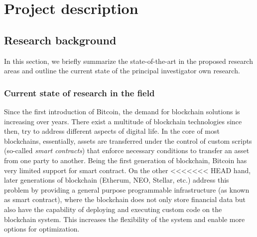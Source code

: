 \newpage
\setcounter{page}{1}
\section{Project description}

\subsection{Research background}

In this section, we briefly summarize the state-of-the-art in the proposed
research areas and outline the current state of the principal investigator own
research.

\subsubsection{Current state of research in the field}
Since the first introduction of Bitcoin, the demand for blockchain solutions is
increasing over years. There exist a multitude of blockchain technologies since
then, try to address different aspects of digital life. In the core of most
blockchains, essentially, assets are transferred under the control of custom
scripts (so-called \emph{smart contracts}) that enforce necessary conditions to
transfer an asset from one party to another. Being the first generation of
blockchain, Bitcoin has very limited support for smart contract. On the other
<<<<<<< HEAD
hand, later generations of blockchain (Etherum, NEO, Stellar, etc.) address this
problem by providing a general purpose programmable infrastructure (as known as
smart contract), where the blockchain does not only store financial data but
also have the capability of deploying and executing custom code on the
blockchain system. This increases the flexibility of the system and enable more
options for optimization.



